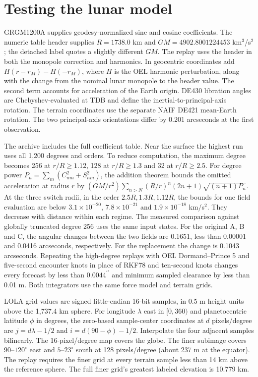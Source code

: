 \documentclass[10pt,letterpaper]{article}
\newcommand{\as}{^{\prime\prime}}
\begin{document}
\section{Testing the lunar model}
GRGM1200A supplies geodesy-normalized sine and cosine coefficients. The numeric table header supplies $R=1738.0$ km and $GM=4902.8001224453$ km$^3$/s$^2$; the detached label quotes a slightly different $GM$. The replay uses the header in both the monopole correction and harmonics. In geocentric coordinates add $H(r-r_M)-H(-r_M)$, where $H$ is the OEL harmonic perturbation, along with the change from the nominal lunar monopole to the header value. The second term accounts for acceleration of the Earth origin. DE430 libration angles are Chebyshev-evaluated at TDB and define the inertial-to-principal-axis rotation. The terrain coordinates use the separate NAIF DE421 mean-Earth rotation. The two principal-axis orientations differ by 0.201 arcseconds at the first observation.

The archive includes the full coefficient table. Near the surface the highest run uses all 1,200 degrees and orders. To reduce computation, the maximum degree becomes 256 at $r/R\ge1.12$, 128 at $r/R\ge1.3$ and 32 at $r/R\ge2.5$. For degree power $P_n=\sum_m(C_{nm}^2+S_{nm}^2)$, the addition theorem bounds the omitted acceleration at radius $r$ by $(GM/r^2)\sum_{n>N}(R/r)^n(2n+1)\sqrt{(n+1)P_n}$. At the three switch radii, in the order $2.5R,1.3R,1.12R$, the bounds for one field evaluation are below $3.1\times10^{-20}$, $7.8\times10^{-21}$ and $1.9\times10^{-18}$ km/s$^2$. They decrease with distance within each regime. The measured comparison against globally truncated degree 256 uses the same input states. For the original A, B and C, the angular changes between the two fields are 0.1651, less than 0.00001 and 0.0416 arcseconds, respectively. For the replacement the change is 0.1043 arcseconds. Repeating the high-degree replays with OEL Dormand--Prince 5 and five-second encounter knots in place of RKF78 and ten-second knots changes every forecast by less than $0.0044\as$ and minimum sampled clearance by less than 0.01 m. Both integrators use the same force model and terrain grids.

LOLA grid values are signed little-endian 16-bit samples, in 0.5 m height units above the 1,737.4 km sphere. For longitude $\lambda$ east in $[0,360)$ and planetocentric latitude $\phi$ in degrees, the zero-based sample-center coordinates at $d$ pixels/degree are $j=d\lambda-1/2$ and $i=d(90-\phi)-1/2$. Interpolate the four adjacent samples bilinearly. The 16-pixel/degree map covers the globe. The finer subimage covers $90$--$120^\circ$ east and $5$--$23^\circ$ south at 128 pixels/degree (about 237 m at the equator). The replay requires the finer grid at every terrain sample less than 14 km above the reference sphere. The full finer grid's greatest labeled elevation is 10.779 km.
\end{document}
